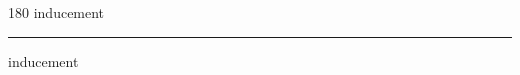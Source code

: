 
\begin{frame}
\begin{center}
\begin{turn}{180}
{\fontsize{2.5cm}{1em}\selectfont inducement}
\end{turn}
\vspace{1em}\par  
\hrule
\vspace{1em}\par  
{\fontsize{2.5cm}{1em}\selectfont inducement}
\end{center}
\end{frame}
